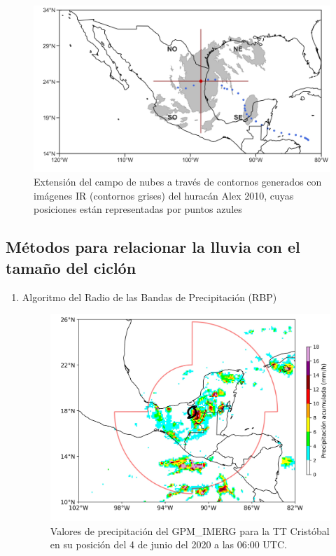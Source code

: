 \begin{frame}
    \begin{figure}
        \centering
        \includegraphics[scale = 0.32]{Images/Figures/Fig_2_3.jpeg}
        \caption{Extensión del campo de nubes a través de contornos generados con imágenes IR (contornos grises) del huracán Alex 2010, cuyas posiciones están representadas por puntos azules}
        \label{fig:fig_5}
    \end{figure}
\end{frame}

\subsection{Métodos para relacionar la lluvia con el tamaño del ciclón}
\begin{frame}
\begin{enumerate}
\setcounter{enumi}{0}
\item Algoritmo del Radio de las Bandas de Precipitación
(RBP)
      \begin{figure}
            \centering
            \includegraphics[scale = 0.39]{Images/Figures/Fig_2_5.jpeg}
            \caption{Valores de precipitación del GPM\_IMERG para la TT Cristóbal en su posición del 4 de junio del 2020 a las 06:00 UTC.}
            \label{fig:fig_6}
        \end{figure}
\end{enumerate}
\end{frame}

